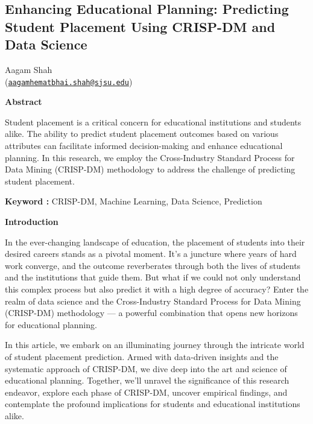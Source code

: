 \documentclass[]{article}
\author{}
\date{}
\newcommand{\textcenter}[1]{\begin{center} \vspace{10px}\textbf{\large #1} \end{center}}
\begin{document}
\begin{center}
\hypertarget{\Large enhancing-educational-planning-predicting-student-placement-using-crisp-dm-and-data-science}{%
\section{\Large Enhancing Educational Planning: Predicting Student Placement
Using CRISP-DM and Data
Science}\label{\Large enhancing-educational-planning-predicting-student-placement-using-crisp-dm-and-data-science}}

Aagam Shah\\
(\href{mailto:aagamhematbhai.shah@sjsu.edu}{\nolinkurl{aagamhematbhai.shah@sjsu.edu}})
\end{center}
\textcenter{Abstract}

Student placement is a critical concern for educational institutions and
students alike. The ability to predict student placement outcomes based
on various attributes can facilitate informed decision-making and
enhance educational planning. In this research, we employ the
Cross-Industry Standard Process for Data Mining (CRISP-DM) methodology
to address the challenge of predicting student placement.

\begin{center}
    \textbf{Keyword :} CRISP-DM, Machine Learning, Data Science, Prediction
\end{center}

\textcenter{Introduction}

In the ever-changing landscape of education, the placement of students
into their desired careers stands as a pivotal moment. It's a juncture
where years of hard work converge, and the outcome reverberates through
both the lives of students and the institutions that guide them. But
what if we could not only understand this complex process but also
predict it with a high degree of accuracy? Enter the realm of data
science and the Cross-Industry Standard Process for Data Mining
(CRISP-DM) methodology --- a powerful combination that opens new
horizons for educational planning.

In this article, we embark on an illuminating journey through the
intricate world of student placement prediction. Armed with data-driven
insights and the systematic approach of CRISP-DM, we dive deep into the
art and science of educational planning. Together, we'll unravel the
significance of this research endeavor, explore each phase of CRISP-DM,
uncover empirical findings, and contemplate the profound implications
for students and educational institutions alike.
\end{document}
